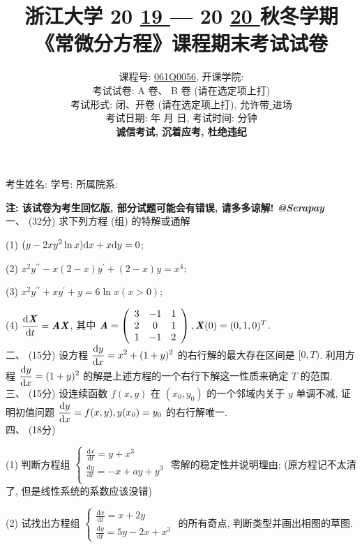 \documentclass[UTF8]{ctexart}
\title{
\textbf{浙江大学 }20 \underline{ 19 } — 20 \underline{ 20 } \textbf{秋冬学期} \\
\textbf{《常微分方程》课程期末考试试卷}
}
\author{
课程号: \underline{ \quad061Q0056\quad }, 开课学院: \underline{ \quad数学科学学院\quad } \\
考试试卷: \checkmark A 卷、 B 卷 (请在选定项上打\checkmark) \\
考试形式: \checkmark 闭、开卷 (请在选定项上打\checkmark), 允许带\underline{ \quad无\quad  }进场 \\
考试日期: \underline{ \quad2020\quad } 年 \underline{ \quad01\quad } 月 \underline{ \quad09\quad } 日, 考试时间: \underline{ \quad120\quad }分钟 \\
\textbf{诚信考试, 沉着应考, 杜绝违纪}
}
\date{}
\begin{document}
\maketitle
\begin{center}
考生姓名: \underline{\quad\quad\quad\quad\quad\quad\quad\quad\quad\quad} 学号: \underline{\quad\quad\quad\quad\quad\quad\quad\quad\quad\quad} 所属院系: \underline{\quad\quad\quad\quad\quad\quad\quad\quad\quad\quad}
\end{center}

\textbf{注: 该试卷为考生回忆版, 部分试题可能会有错误, 请多多谅解! \textit{@Serapay}}
\\

一、 (32分) 求下列方程 (组) 的特解或通解

(1) $\displaystyle(y-2xy^2\ln x){\rm d}x+x{\rm d}y=0$;

(2) $\displaystyle x^2y^{\prime\prime}-x(2-x)y^{\prime}+(2-x)y=x^4$;

(3) $x^2y^{\prime\prime}+xy^{\prime}+y=6\ln x(x>0)$;

(4) $\displaystyle\frac{{\rm d}\textbf{\textit{X}}}{{\rm d}t}=\textbf{\textit{AX}}$, 其中 $\textbf{\textit{A}}=
\left(\begin{array}{ccc}
3 & -1 & 1 \\
2 & 0 & 1 \\
1 & -1 & 2
\end{array}\right),\textbf{\textit{X}}(0)=(0,1,0)^T$.
\\

二、 (15分) 设方程 $\displaystyle\frac{{\rm d}y}{{\rm d}x}=x^2+(1+y)^2$ 的右行解的最大存在区间是 $[0,T)$. 利用方程 $\displaystyle\frac{{\rm d}y}{{\rm d}x}=(1+y)^2$ 的解是上述方程的一个右行下解这一性质来确定 $T$ 的范围.
\\

三、 (15分) 设连续函数 $f(x,y)$ 在 $(x_0,y_0)$ 的一个邻域内关于 $y$ 单调不减, 证明初值问题 $\displaystyle\frac{{\rm d}y}{{\rm d}x}=f(x,y), y(x_0)=y_0$ 的右行解唯一.
\\

四、 (18分)

(1) 判断方程组 $\begin{cases}
	\displaystyle\frac{\text{d}x}{\text{d}t}=y+x^3\\
	\displaystyle\frac{\text{d}y}{\text{d}t}=-x+ay+y^3\\
    \end{cases}$ 零解的稳定性并说明理由; (原方程记不太清了, 但是线性系统的系数应该没错)

(2) 试找出方程组 $\begin{cases}
              \displaystyle\frac{\text{d}x}{\text{d}t}=x+2y\\
              \displaystyle\frac{\text{d}y}{\text{d}t}=5y-2x+x^3
            \end{cases}$ 的所有奇点, 判断类型并画出相图的草图.
\\
\end{document}
